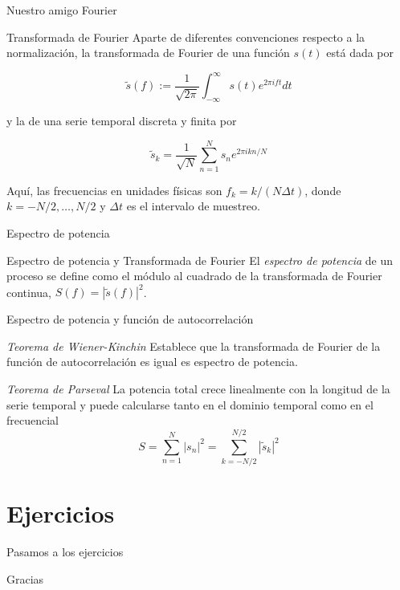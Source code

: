 \documentclass[11pt]{beamer}
\begin{document}
\begin{frame}{Nuestro amigo Fourier}
	\begin{block}{Transformada de Fourier}
		Aparte de diferentes convenciones respecto a la normalización, la transformada de Fourier de una función $s(t)$ está dada por

\begin{equation}
\tilde{s}(f) := \frac{1}{\sqrt{2\pi}} \int_{-\infty}^{\infty} s(t) e^{2\pi i f t} dt
\end{equation}

y la de una serie temporal discreta y finita por

\begin{equation}
\tilde{s}_k = \frac{1}{\sqrt{N}} \sum_{n=1}^N s_n e^{2\pi i k n / N}
\end{equation}

Aquí, las frecuencias en unidades físicas son $f_k = k / (N \Delta t)$, donde $k = -N/2, \ldots, N/2$ y $\Delta t$ es el intervalo de muestreo.
	\end{block}
\end{frame}

\begin{frame}{Espectro de potencia}
	\begin{block}{Espectro de potencia y Transformada de Fourier}
		El \emph{espectro de potencia} de un proceso se define como el módulo al cuadrado de la transformada de Fourier continua, $S(f) = |\tilde{s}(f)|^2$. 
	\end{block}
\end{frame}

\begin{frame}{Espectro de potencia y función de autocorrelación}
	\begin{block}{\textit{Teorema de Wiener-Kinchin}}
		Establece que la transformada de Fourier de la función de autocorrelación es igual es espectro de potencia.
	\end{block}
	\begin{block}{\textit{Teorema de Parseval}}
		La potencia total crece linealmente con la longitud de la serie temporal y puede calcularse tanto en el dominio temporal como en el frecuencial
\begin{equation}
S = \sum_{n=1}^N |s_n|^2 = \sum_{k=-N/2}^{N/2} |\tilde{s}_k|^2 
\end{equation}
	\end{block}
\end{frame}
\section{Ejercicios}
\begin{frame}{Pasamos a los ejercicios}
	\begin{center}
		\Huge
		Gracias
	\end{center}
\end{frame}
\end{document}
